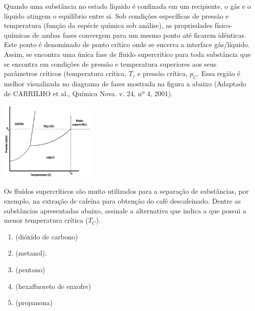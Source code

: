 Quando uma substância no estado líquido é confinada em um recipiente, o gás e o líquido atingem o equilíbrio entre si. Sob condições específicas de pressão e temperatura (função da espécie química sob análise), as propriedades físico-químicas de ambas fases convergem para um mesmo ponto até ficarem idênticas. Este ponto é denominado de ponto crítico onde se encerra a interface gás/líquido. Assim, se encontra uma única fase de fluido supercrítico para toda substância que se encontra em condições de pressão e temperatura superiores aos seus parâmetros críticos (temperatura crítica, $T_c$ e pressão crítica, $p_C$. Essa região é melhor visualizada no diagrama de fases mostrada na figura a abaixo (Adaptado de CARRILHO et al., Química Nova. v. 24, nº 4, 2001).

\begin{center}
\includegraphics[width=0.35\textwidth]{figure.png}
\end{center}

 Os fluídos supercríticos são muito utilizados para a separação de substâncias, por exemplo, na extração de cafeína para obtenção do café descafeinado. Dentre as substâncias apresentadas abaixo, assinale a alternativa que indica a que possui a menor temperatura crítica ($T_C$). 

 \begin{enumerate}[label = (\alph*)]
	
	\item {} (dióxido de carbono) 
	\item {} (metanol). 
	\item {} (pentano) 
	\item {} (hexafluoreto de enxofre) 
	\item {} (propanona)
\end{enumerate}
